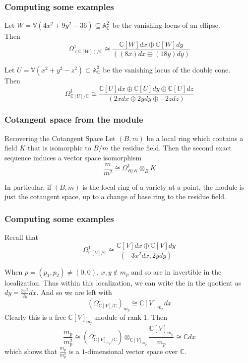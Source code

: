 \documentclass[10pt]{beamer}
\newcommand{\C}{\mathbb{C}}
\newcommand{\A}{\mathbb{A}}
\begin{document}
\begin{frame}[fragile]
\frametitle{Computing some examples}

\begin{examples} Let $W=\mathbb{V}(4x^2+9y^2-36)\subseteq\A_\C^2$ be the vanishing locus of an ellipse. \\
Then $$\Omega_{(\C[W])/\C}^1\cong\frac{\C[W]dx\oplus\C[W]dy}{((8x)dx\oplus(18y)dy)}$$ 
\end{examples}

\begin{examples} Let $U=\mathbb{V}(x^2+y^2-z^2)\subset\A_\C^3$ be the vanishing locus of the double cone. \\
Then $$\Omega_{\C[U]/\C}^1\cong\frac{\C[U]dx\oplus\C[U]dy\oplus\C[U]dz}{(2xdx\oplus 2ydy\oplus -2zdz)}$$
\end{examples}

\end{frame}

\begin{frame}[fragile]
\frametitle{Cotangent space from the module}

\begin{block}{Recovering the Cotangent Space} Let $(B,m)$ be a local ring which contains a field $K$ that is isomorphic to $B/m$ the residue field. Then the second exact sequence induces a vector space isomorphism $$\frac{m}{m^2}\cong\Omega_{B/K}^1\otimes_B K$$
\end{block}

In particular, if $(B,m)$ is the local ring of a variety at a point, the module is just the cotangent space, up to a change of base ring to the residue field. 

\end{frame}

\begin{frame}[fragile]
\frametitle{Computing some examples}

Recall that $$\Omega_{\C[V]/\C}^1\cong\frac{\C[V]dx\oplus\C[V]dy}{(-3x^2dx,2ydy)}$$

\begin{block}{}
When $p=(p_1,p_2)\neq(0,0)$, $x,y\notin m_p$ and so are in invertible in the localization. Thus within this localization, we can write the in the quotient as $dy=\frac{3x^2}{2y}dx$. And so we are left with $$\left(\Omega_{\C[V]/\C}^1\right)_{m_p}\cong\C[V]_{m_p}dx$$ Clearly this is a free $\C[V]_{m_p}$-module of rank $1$. Then $$\frac{m_p}{m_p^2}\cong\left(\Omega_{\C[V]_{m_p}/\C}^1\right)\otimes_{\C[V]_{m_p}}\frac{\C[V]_{m_p}}{m_p}\cong\C dx$$
which shows that $\frac{m_p}{m_p^2}$ is a $1$-dimensional vector space over $\C$. 
\end{block}

\end{frame}
\end{document}
